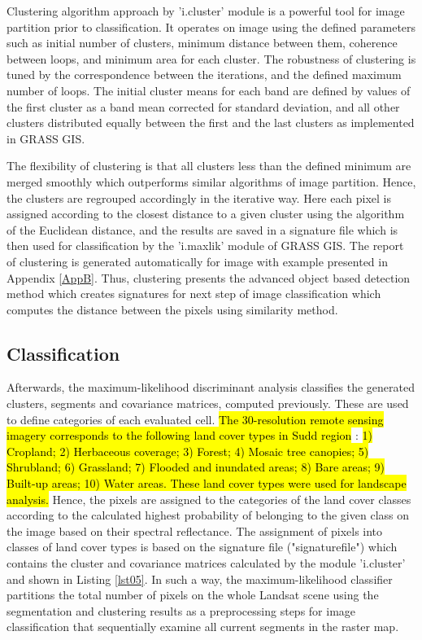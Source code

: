 \documentclass[analytics,article,submit,pdftex,moreauthors]{Definitions/mdpi}
\begin{document}
Clustering algorithm approach by 'i.cluster' module is a powerful tool for image partition prior to classification. It operates on image using the defined parameters such as initial number of clusters, minimum distance between them, coherence between loops, and minimum area for each cluster. The robustness of clustering is tuned by the correspondence between the iterations, and the defined maximum number of loops. The initial cluster means for each band are defined by values of the first cluster as a band mean corrected for standard deviation, and all other clusters distributed equally between the first and the last clusters as implemented in GRASS GIS. 

The flexibility of clustering is that all clusters less than the defined minimum are merged smoothly which outperforms similar algorithms of image partition. Hence, the clusters are regrouped accordingly in the iterative way. Here each pixel is assigned according to the closest distance to a given cluster using the algorithm of the Euclidean distance, and the results are saved in a signature file which is then used for classification by the 'i.maxlik' module of GRASS GIS. The report of clustering is generated automatically for image with example presented in Appendix \ref{AppB}. Thus, clustering presents the advanced object based detection method which creates signatures for next step of image classification which computes the distance between the pixels using similarity method.

\subsection{Classification}
Afterwards, the maximum-likelihood discriminant analysis classifies the generated clusters, segments and covariance matrices, computed previously. These are used to define categories of each evaluated cell. \hl{The 30-resolution remote sensing imagery corresponds to the following land cover types in Sudd region} \cite{FAO2023}: \hl{1) Cropland; 2) Herbaceous coverage; 3) Forest; 4) Mosaic tree canopies; 5) Shrubland; 6) Grassland; 7) Flooded and inundated areas; 8) Bare areas; 9) Built-up areas; 10) Water areas. These land cover types were used for landscape analysis. }Hence, the pixels are assigned to the categories of the land cover classes according to the calculated highest probability of belonging to the given class on the image based on their spectral reflectance. The assignment of pixels into classes of land cover types is based on the signature file ("signaturefile") which contains the cluster and covariance matrices calculated by the module 'i.cluster' and shown in Listing \ref{lst05}. In such a way, the maximum-likelihood classifier partitions the total number of pixels on the whole Landsat scene using the segmentation and clustering results as a preprocessing steps for image classification that sequentially examine all current segments in the raster map. 
\end{document}
